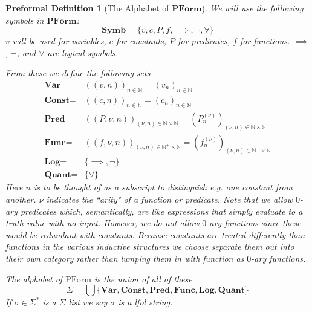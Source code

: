 \documentclass[oneside, 12pt]{book}
\theoremstyle{break}
\newtheorem{preformal definition}[definition]{Preformal Definition}
\newtheorem{preformal theorem}[theorem]{Preformal Theorem}
\newcommand{\qq}[1]{``#1"}
\newcommand{\N}[0]{\mathbb{N}}
\begin{document}
		\begin{preformal definition}[The Alphabet of $\textbf{PForm}$]
			We will use the following symbols in $\textbf{PForm}$:
			\begin{equation*}
				\textbf{Symb} = \{v, c, P, f, \implies, \lnot, \forall\}
			\end{equation*}
			$v$ will be used for variables, $c$ for constants, $P$ for predicates, $f$ for functions.
			$\implies$, $\lnot$, and $\forall$ are logical symbols.
			
			From these we define the following sets
			\begin{align*}
				\textbf{Var} =& ((v, n))_{n\in \N} = (v_n)_{n\in \N}\\
				\textbf{Const} =& ((c, n))_{n\in \N} = (c_n)_{n\in \N}\\				
				\textbf{Pred} =& ((P, \nu, n))_{(\nu, n) \in \N \times \N} = (P_n^{(\nu)})_{(\nu, n) \in \N\times \N}\\
				\textbf{Func} =& ((f, \nu, n))_{(\nu, n) \in \N^+ \times \N} = (f_n^{(\nu)})_{(\nu, n) \in \N^+ \times \N}\\				
				\textbf{Log} =& \{\implies, \lnot\}\\
				\textbf{Quant} =& \{\forall\}
			\end{align*}
			Here $n$ is to be thought of as a subscript to distinguish e.g. one constant from another.
			$\nu$ indicates the \qq{arity} of a function or predicate.
			Note that we allow $0$-ary predicates which, semantically, are like expressions that simply evaluate to a truth value with no input.
			However, we do not allow $0$-ary functions since these would be redundant with constants.
			Because constants are treated differently than functions in the various inductive structures we choose separate them out into their own category rather than lumping them in with function as $0$-ary functions.
			
			The alphabet of $\text{PForm}$ is the union of all of these
			\begin{equation*}
				\Sigma = \bigcup \{\textbf{Var}, \textbf{Const}, \textbf{Pred}, \textbf{Func}, \textbf{Log}, \textbf{Quant}\}
			\end{equation*}
			If $\sigma \in \Sigma^*$ is a $\Sigma$ list we say $\sigma$ is a \gls{lfol} string.
			

		\end{preformal definition}
		
\end{document}
